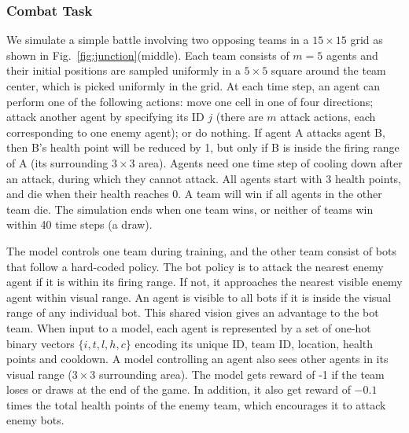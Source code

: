 \documentclass{article}
\newcommand{\fig}[1]{Fig.~\ref{fig:#1}}
\begin{document}
\vspace{-3mm}
\subsubsection{Combat Task}
\vspace{-2mm}
We simulate a simple battle involving two opposing teams in a
$15\times15$ grid as shown in \fig{junction}(middle). Each team
consists of $m=5$ agents and their initial positions are sampled
uniformly in a $5\times 5$ square around the team center, which is
picked uniformly in the grid.  At each time step, an agent can perform
one of the following actions: move one cell in one of four directions;
attack another agent by specifying its ID $j$ (there are $m$ attack
actions, each corresponding to one enemy agent); or do nothing. If
agent A attacks agent B, then B's health point will be reduced by 1,
but only if B is inside the firing range of A (its surrounding
$3\times 3$ area). Agents need one time step of cooling down after an
attack, during which they cannot attack. All agents start with 3 health
points, and die when their health reaches 0.  A team will win if all
agents in the other team die.  The simulation ends when one team wins,
or neither of teams win within 40 time steps (a draw).

The model controls one team during training, and the other team
consist of bots that follow a hard-coded policy. The bot policy is to
attack the nearest enemy agent if it is within its firing range. If
not, it approaches the nearest visible enemy agent within visual range. An
agent is visible to all bots if it is inside the visual range of any
individual bot. This shared vision gives an advantage to the bot team.
When input to a model, each agent is represented by a set of one-hot
binary vectors $\{i, t, l, h, c\}$ encoding its unique ID, team ID,
location, health points and cooldown. A model controlling an agent
also sees other agents in its visual range ($3 \times 3$ surrounding
area). The model gets reward of -1 if the team loses or draws at the
end of the game. In addition, it also get reward of $-0.1$ times the
total health points of the enemy team, which encourages it to attack
enemy bots.
\end{document}
